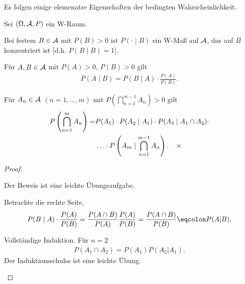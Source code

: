 Es folgen einige elemenatre Eigenschaften der bedingten Wahrscheinlichkeit.
\begin{prop}
\label{prop:1.7}
Sei $(\Omega, \AA, P)$ ein W-Raum.
\begin{propenum}
\item
Bei festem $B \in \AA$ mit $P(B) > 0 $ ist $P(\cdot\mid B)$ ein W-Maß auf
$\AA$, das auf $B$ konzentriert ist [d.h. $P(B\mid B) =1$].
\item
Für $A,B \in \AA$ mit $P(A) > 0$, $P(B) > 0$ gilt
\begin{align*}
P(A\mid B)= P(B\mid A)\cdot \frac{P(A)}{P(B)}.
\end{align*}
\item Für $A_{n} \in \AA$ $(n=1, \ldots ,m)$ mit
  $P(\bigcap^{m-1}_{n=1}A_{n})>0$ gilt
\begin{align*}
P\left(\bigcap^{m}_{n=1}A_{n}\right) = &P(A_{1}) \cdot P(A_{2}\mid A_{1})\cdot
P(A_{3}\mid A_{1}\cap A_{2}) \cdot \\ & \ldots \cdot
P\left(A_{m}\mid \bigcap\limits^{m-1}_{n=1}A_{n}\right).\fishhere
\end{align*}
\end{propenum}
\end{prop}

\begin{proof}
\begin{proofenum}
  \item Der Beweis ist eine leichte Übungsaufgabe.
  \item Betrachte die rechte Seite,
\begin{align*}
P(B\mid A)\cdot \frac{P(A)}{P(B)} = \frac{P(A\cap B)}{P(A)}\frac{P(A)}{P(B)}
=\frac{P(A\cap B)}{P(B)} \defr P(A|B).
\end{align*}
\item Vollständige Induktion. Für $n=2$
\begin{align*}
P(A_1\cap A_2) = P(A_1)P(A_2|A_1).
\end{align*}
Der Induktionsschulss ist eine leichte Übung.\qedhere
\end{proofenum}
\end{proof}
 
